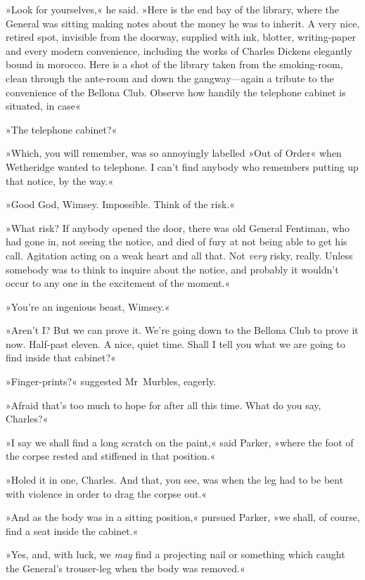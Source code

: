 »Look for yourselves,« he said. »Here is the end bay of the library, where the General was sitting making notes about the money he was to inherit. A very nice, retired spot, invisible from the doorway, supplied with ink, blotter, writing-paper and every modern convenience, including the works of Charles Dickens elegantly bound in morocco. Here is a shot of the library taken from the smoking-room, clean through the ante-room and down the gangway—again a tribute to the convenience of the Bellona Club. Observe how handily the telephone cabinet is situated, in case\longdash«

»The telephone cabinet?«

»Which, you will remember, was so annoyingly labelled »Out of Order« when Wetheridge wanted to telephone. I can't find anybody who remembers putting up that notice, by the way.«

»Good God, Wimsey. Impossible. Think of the risk.«

»What risk? If anybody opened the door, there was old General Fentiman, who had gone in, not seeing the notice, and died of fury at not being able to get his call. Agitation acting on a weak heart and all that. Not \textit{very} risky, really. Unless somebody was to think to inquire about the notice, and probably it wouldn't occur to any one in the excitement of the moment.«

»You're an ingenious beast, Wimsey.«

»Aren't I? But we can prove it. We're going down to the Bellona Club to prove it now. Half-past eleven. A nice, quiet time. Shall I tell you what we are going to find inside that cabinet?«

»Finger-prints?« suggested Mr~Murbles, eagerly.

»Afraid that's too much to hope for after all this time. What do you say, Charles?«

»I say we shall find a long scratch on the paint,« said Parker, »where the foot of the corpse rested and stiffened in that position.«

»Holed it in one, Charles. And that, you see, was when the leg had to be bent with violence in order to drag the corpse out.«

»And as the body was in a sitting position,« pursued Parker, »we shall, of course, find a seat inside the cabinet.«

»Yes, and, with luck, we \textit{may} find a projecting nail or something which caught the General's trouser-leg when the body was removed.«

